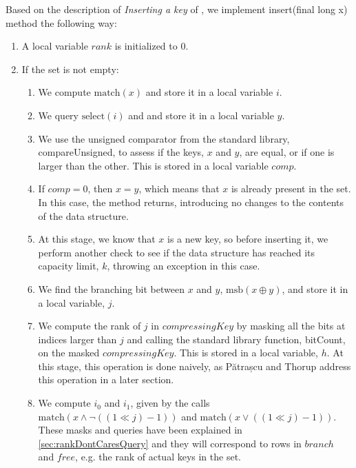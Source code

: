 Based on the description of \textit{Inserting a key} of \cite{patrascu2014dynamic}, we implement {\ttfamily insert(final long x)} method the following way:
\begin{enumerate}
    \item
    A local variable $rank$ is initialized to $0$.
    
    \item
    If the set is not empty:
    \begin{enumerate}
        \item
        We compute $\text{match}(x)$ and store it in a local variable $i$.
        
        \item
        We query $\text{select}(i)$ and and store it in a local variable $y$.
        
        \item
        We use the unsigned comparator from the standard library, {\ttfamily compareUnsigned}, to assess if the keys, $x$ and $y$, are equal, or if one is larger than the other. This is stored in a local variable $comp$.
        
        \item
        If $comp = 0$, then $x = y$, which means that $x$ is already present in the set. In this case, the method returns, introducing no changes to the contents of the data structure.
        
        \item
        At this stage, we know that $x$ is a new key, so before inserting it, we perform another check to see if the data structure has reached its capacity limit, $k$, throwing an exception in this case.
        
        \item
        We find the branching bit between $x$ and $y$, $\text{msb}(x \oplus y)$, and store it in a local variable, $j$.
        
        \item \label{blt:naiveRankJ}
        We compute the rank of $j$ in $compressingKey$ by masking all the bits at indices larger than $j$ and calling the standard library function, {\ttfamily bitCount}, on the masked $compressingKey$. This is stored in a local variable, $h$. At this stage, this operation is done naively, as Pătrașcu and Thorup address this operation in a later section.
        
        \item
        We compute $i_0$ and $i_1$, given by the calls $\text{match}(x \wedge \neg((1 \ll j) - 1))$ and $\text{match}(x \vee ((1 \ll j) - 1))$. These masks and queries have been explained in \ref{sec:rankDontCaresQuery} and they will correspond to rows in $branch$ and $free$, e.g. the rank of actual keys in the set.
        

\end{enumerate}
\end{enumerate}
